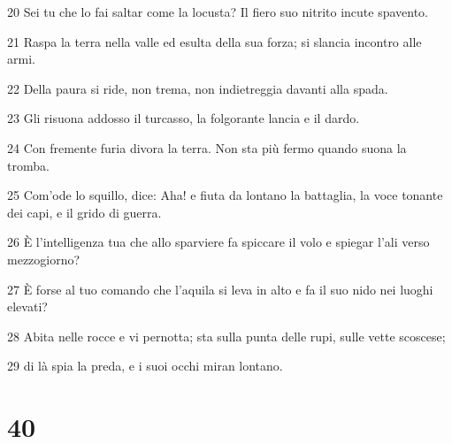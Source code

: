 \par 20 Sei tu che lo fai saltar come la locusta? Il fiero suo nitrito incute spavento.
\par 21 Raspa la terra nella valle ed esulta della sua forza; si slancia incontro alle armi.
\par 22 Della paura si ride, non trema, non indietreggia davanti alla spada.
\par 23 Gli risuona addosso il turcasso, la folgorante lancia e il dardo.
\par 24 Con fremente furia divora la terra. Non sta più fermo quando suona la tromba.
\par 25 Com'ode lo squillo, dice: Aha! e fiuta da lontano la battaglia, la voce tonante dei capi, e il grido di guerra.
\par 26 È l'intelligenza tua che allo sparviere fa spiccare il volo e spiegar l'ali verso mezzogiorno?
\par 27 È forse al tuo comando che l'aquila si leva in alto e fa il suo nido nei luoghi elevati?
\par 28 Abita nelle rocce e vi pernotta; sta sulla punta delle rupi, sulle vette scoscese;
\par 29 di là spia la preda, e i suoi occhi miran lontano.

\chapter{40}


